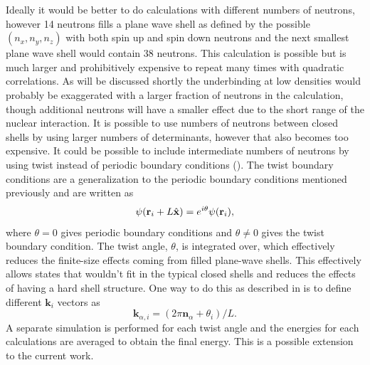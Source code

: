 Ideally it would be better to do calculations with different numbers of neutrons, however 14 neutrons fills a plane wave shell as defined by the possible $(n_{x},n_{y},n_{z})$ with both spin up and spin down neutrons and the next smallest plane wave shell would contain 38 neutrons. This calculation is possible but is much larger and prohibitively expensive to repeat many times with quadratic correlations. As will be discussed shortly the underbinding at low densities would probably be exaggerated with a larger fraction of neutrons in the calculation, though additional neutrons will have a smaller effect due to the short range of the nuclear interaction. It is possible to use numbers of neutrons between closed shells by using larger numbers of determinants, however that also becomes too expensive. It could be possible to include intermediate numbers of neutrons by using twist instead of periodic boundary conditions (\cite{lin2001}). The twist boundary conditions are a generalization to the periodic boundary conditions mentioned previously and are written as
\begin{equation}
   \psi(\mathbf{r}_i+L\hat{\mathbf{x}}) = e^{i\theta}\psi(\mathbf{r}_i),
\end{equation}
where $\theta=0$ gives periodic boundary conditions and $\theta\ne0$ gives the twist boundary condition. The twist angle, $\theta$, is integrated over, which effectively reduces the finite-size effects coming from filled plane-wave shells. This effectively allows states that wouldn't fit in the typical closed shells and reduces the effects of having a hard shell structure. One way to do this as described in \cite{gandolfi2009} is to define different $\mathbf{k}_i$ vectors as
\begin{equation}
   \mathbf{k}_{\alpha,i} = (2\pi\mathbf{n}_\alpha + \theta_i)/L.
\end{equation}
A separate simulation is performed for each twist angle and the energies for each calculations are averaged to obtain the final energy. This is a possible extension to the current work.

